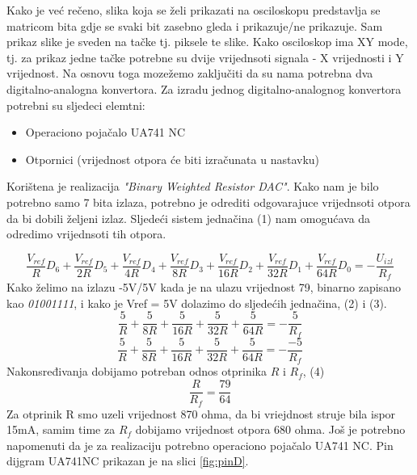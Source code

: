 \documentclass[12pt]{article}
\begin{document}
Kako je već rečeno, slika koja se želi prikazati na osciloskopu predstavlja se matricom bita gdje se svaki bit zasebno gleda i prikazuje/ne prikazuje. Sam prikaz slike je sveden na tačke tj. piksele te slike. Kako osciloskop ima XY mode, tj. za prikaz jedne tačke potrebne su dvije vrijednsoti signala - X vrijednosti i Y vrijednost. Na osnovu toga mozežemo zaključiti da su nama potrebna dva digitalno-analogna konvertora.
Za izradu jednog digitalno-analognog konvertora potrebni su sljedeci elemtni:
\begin{itemize}
  \item Operaciono pojačalo UA741 NC
  \item Otpornici (vrijednost otpora će biti izračunata u nastavku)
\end{itemize}
\newline

Korištena je realizacija  \textit{"Binary Weighted Resistor DAC"}. Kako nam je bilo potrebno samo 7 bita izlaza, potrebno je odrediti odgovarajuce vrijednsoti otpora da bi dobili željeni izlaz. Sljedeći sistem jednačina (1) nam omogućava da odredimo vrijednsoti tih otpora.

\begin{equation}
\frac{V_{ref}}{R} D_{6} + \frac{V_{ref}}{2R} D_{5} 
 +\frac{V_{ref}}{4R} D_{4} 
+\frac{V_{ref}}{8R} D_{3} 
+\frac{V_{ref}}{16R} D_{2} 
+\frac{V_{ref}}{32R} D_{1} 
+\frac{V_{ref}}{64R} D_{0} = - \frac{U_{izl}}{R_{f}}
\end{equation}
\newline 
Kako želimo na izlazu -5V/5V kada je na ulazu vrijednost 79, binarno zapisano kao \textit{01001111}, i kako je Vref = 5V dolazimo do sljedećih jednačina, (2) i (3).
\begin{equation}
\frac{5}{R} 
+\frac{5}{8R} 
+\frac{5}{16R} 
+\frac{5}{32R}
+\frac{5}{64R}= - \frac{5}{R_{f}}
\end{equation}
\begin{equation}
\frac{5}{R} 
+\frac{5}{8R} 
+\frac{5}{16R} 
+\frac{5}{32R}  
+\frac{5}{64R}= - \frac{-5}{R_{f}}
\end{equation}
Nakonsređivanja dobijamo potreban odnos otprinika $R$ i $R_{f}$, (4)
\begin{equation}
\frac{R}{R_{f}} = \frac{79}{64}
\end{equation}
Za otprinik R smo uzeli vrijednost 870 ohma, da bi vriejdnost struje bila ispor 15mA, samim time za $R_{f}$ dobijamo vrijednost otpora 680 ohma. \newline
Još je potrebno napomenuti da je za realizaciju potrebno operaciono pojačalo UA741 NC. Pin dijgram UA741NC prikazan je na slici \ref{fig:pinD}.\newline
\end{document}
